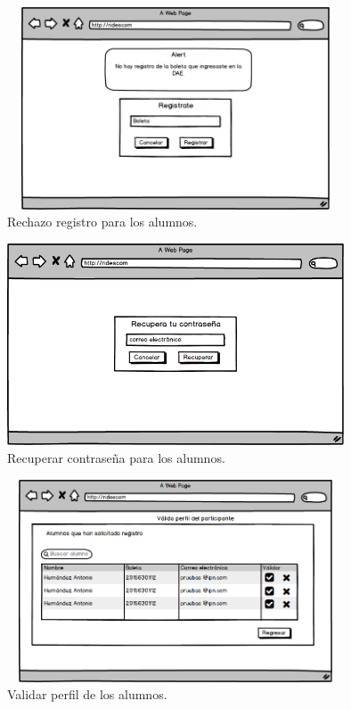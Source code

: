 \begin{figure}[hbt!]
	\centering
	\includegraphics[width=10cm, height=6cm]{Imagenes/Disenos/VistasBorradas/p3RechazoRegistro.png}
	\caption{Rechazo registro para los alumnos.}
\end{figure}

\begin{figure}[hbt!]
	\centering
	\includegraphics[width=10cm, height=6cm]{Imagenes/Disenos/VistasBorradas/p5Recuperarcontrasena.png}
	\caption{Recuperar contraseña para los alumnos.}
\end{figure}

\begin{figure}[hbt!]
	\centering
	\includegraphics[width=10cm, height=6cm]{Imagenes/Disenos/VistasBorradas/p18ValidaPerfil.png}
	\caption{Validar perfil de los alumnos.}
\end{figure}
\pagebreak

